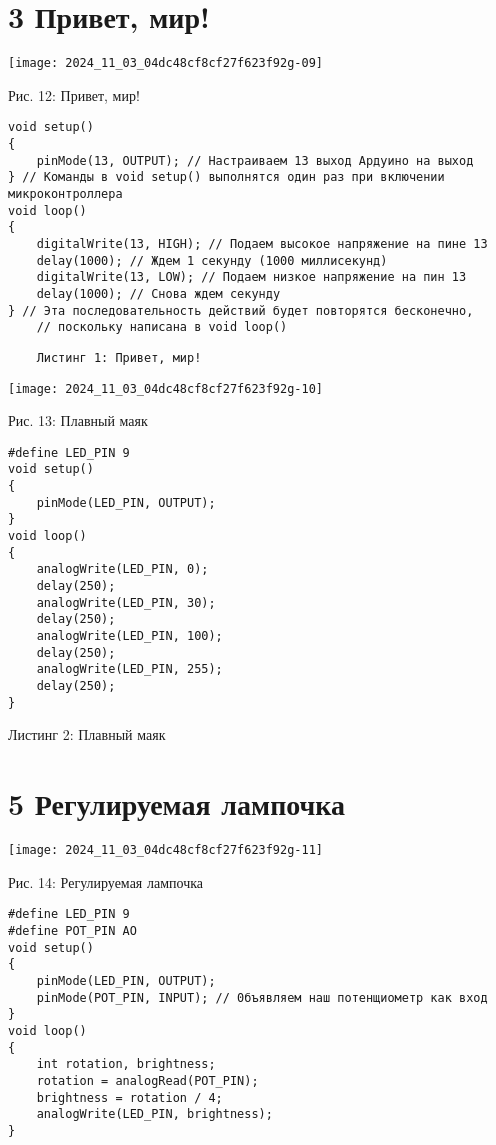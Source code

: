 \documentclass[10pt]{article}
\begin{document}
\section*{3 Привет, мир!}
\begin{center}
\texttt{[image: 2024\_11\_03\_04dc48cf8cf27f623f92g-09]}
\end{center}

Рис. 12: Привет, мир!

\begin{verbatim}
void setup()
{
    pinMode(13, OUTPUT); // Настраиваем 13 выход Ардуино на выход
} // Команды в void setup() выполнятся один раз при включении микроконтроллера
void loop()
{
    digitalWrite(13, HIGH); // Подаем высокое напряжение на пине 13
    delay(1000); // Ждем 1 секунду (1000 миллисекунд)
    digitalWrite(13, LOW); // Подаем низкое напряжение на пин 13
    delay(1000); // Снова ждем секунду
} // Эта последовательность действий будет повторятся бесконечно,
    // поскольку написана в void loop()
\end{verbatim}

\begin{verbatim}
    Листинг 1: Привет, мир!
\end{verbatim}

\begin{center}
\texttt{[image: 2024\_11\_03\_04dc48cf8cf27f623f92g-10]}
\end{center}

Рис. 13: Плавный маяк

\begin{verbatim}
#define LED_PIN 9
void setup()
{
    pinMode(LED_PIN, OUTPUT);
}
void loop()
{
    analogWrite(LED_PIN, 0);
    delay(250);
    analogWrite(LED_PIN, 30);
    delay(250);
    analogWrite(LED_PIN, 100);
    delay(250);
    analogWrite(LED_PIN, 255);
    delay(250);
}
\end{verbatim}

Листинг 2: Плавный маяк

\section*{5 Регулируемая лампочка}
\begin{center}
\texttt{[image: 2024\_11\_03\_04dc48cf8cf27f623f92g-11]}
\end{center}

Рис. 14: Регулируемая лампочка

\begin{verbatim}
#define LED_PIN 9
#define POT_PIN AO
void setup()
{
    pinMode(LED_PIN, OUTPUT);
    pinMode(POT_PIN, INPUT); // 0бъявляем наш потенщиометр как вход
}
void loop()
{
    int rotation, brightness;
    rotation = analogRead(POT_PIN);
    brightness = rotation / 4;
    analogWrite(LED_PIN, brightness);
}
\end{verbatim}
\end{document}

